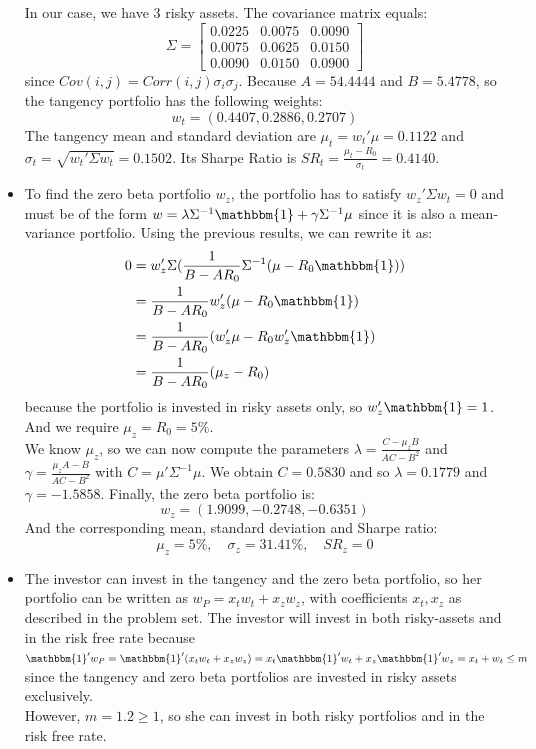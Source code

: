 \documentclass[10pt]{article}
\newenvironment{exercise}[2][Exercise]{\begin{trivlist}
  \item[\hskip \labelsep {\bfseries #1}\hskip \labelsep {\bfseries #2.}]}{\end{trivlist}}
\begin{document}
\begin{exercise}{1}
\begin{itemize}
    In our case, we have $3$ risky assets. The covariance matrix equals:
    $$ \Sigma = \left[ {\begin{array}{ccc}
      0.0225  &  0.0075  &  0.0090\\
      0.0075  &  0.0625  &  0.0150\\
      0.0090  &  0.0150  &  0.0900
    \end{array} } \right]$$ since $Cov(i,j) = Corr(i,j)\sigma_i\sigma_j$. Because $A = 54.4444$ and $B = 5.4778$, so the tangency portfolio has the following weights: $$ w_t = (0.4407, 0.2886, 0.2707)$$ 
    The tangency mean and standard deviation are $\mu_t = w_t'\mu = 0.1122$ and $\sigma_t = \sqrt{w_t'\Sigma w_t} = 0.1502$. Its Sharpe Ratio is $SR_t = \frac{\mu_t - R_0}{\sigma_t} = 0.4140$. 
    \item To find the zero beta portfolio $w_z$, the portfolio has to satisfy $w_z'\Sigma w_t = 0$ and must be of the form $w = \lambda\Sigma^{-1}\mathbbm{1}+ \gamma\Sigma^{-1}\mu$ since it is also a mean-variance portfolio. Using the previous results, we can rewrite it as:
    \begin{align*}
      0 &= w_z'\Sigma(\frac{1}{B-AR_0}\Sigma^{-1}(\mu-R_0\mathbbm{1})) \\
      &= \frac{1}{B-AR_0}w_z'(\mu-R_0\mathbbm{1}) \\
      &= \frac{1}{B-AR_0}(w_z'\mu - R_0w_z'\mathbbm{1}) \\
      &= \frac{1}{B-AR_0}(\mu_z - R_0)
    \end{align*} because the portfolio is invested in risky assets only, so $w_z'\mathbbm{1} = 1$. And we require $\mu_z = R_0 = 5\%$. 
    \\
    We know $\mu_z$, so we can now compute the parameters $\lambda = \frac{C-\mu_zB}{AC-B^2}$ and $\gamma = \frac{\mu_zA-B}{AC-B^2}$ with $C = \mu'\Sigma^{-1}\mu$. 
    We obtain $C = 0.5830$ and so $\lambda= 0.1779$ and $\gamma = -1.5858$. 
    Finally, the zero beta portfolio is: 
    $$ w_z = (1.9099, -0.2748, -0.6351)$$
    And the corresponding mean, standard deviation and Sharpe ratio: 
    $$ \mu_z = 5\%, \quad \sigma_z = 31.41\%, \quad SR_z = 0$$
    \item The investor can invest in the tangency and the zero beta portfolio, so her portfolio can be written as $w_P = x_tw_t + x_zw_z$, with coefficients $x_t,x_z$ as described in the problem set. The investor will invest in both risky-assets and in the risk free rate because $\mathbbm{1}'w_P = \mathbbm{1}'(x_tw_t+x_zw_z) = x_t\mathbbm{1}'w_t + x_z\mathbbm{1}'w_z = x_t + w_t \leq m$ since the tangency and zero beta portfolios are invested in risky assets exclusively. 
    \\ However, $m =1.2\geq 1$, so she can invest in both risky portfolios and in the risk free rate.  


\end{itemize}
\end{exercise}
\end{document}
